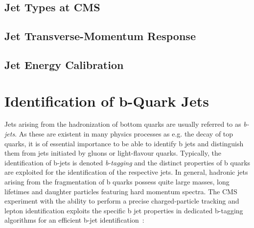 \subsection{Jet Types at CMS}
\label{subsec:jets_types}

\subsection{Jet Transverse-Momentum Response}
\label{subsec:jets_response}

\subsection{Jet Energy Calibration}
\label{subsec:jets_calib}

\section{Identification of b-Quark Jets}
\label{sec:btagging}
Jets arising from the hadronization of bottom quarks are usually referred to as \textit{b-jets}. As these are existent in many physics processes as e.g. the decay of top quarks, it is of essential importance to be able to identify b jets and distinguish them from jets initiated by gluons or light-flavour quarks. Typically, the identification of b-jets is denoted \textit{b-tagging} and the distinct properties of b quarks are exploited for the identification of the respective jets. In general, hadronic jets arising from the fragmentation of b quarks possess quite large masses, long lifetimes and daughter particles featuring hard momentum spectra. The CMS experiment with the ability to perform a precise charged-particle tracking and lepton identification exploits the specific b jet properties in dedicated b-tagging algorithms for an efficient b-jet identification~\cite{Chatrchyan:2012jua}:
